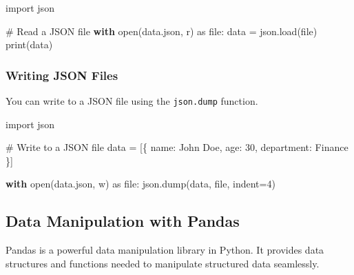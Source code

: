 \documentclass[
  letterpaper,
  DIV=11,
  numbers=noendperiod]{scrreprt}
\newenvironment{Shaded}{\begin{snugshade}}{\end{snugshade}}
\newcommand{\BuiltInTok}[1]{\textcolor[rgb]{0.00,0.23,0.31}{#1}}
\newcommand{\CommentTok}[1]{\textcolor[rgb]{0.37,0.37,0.37}{#1}}
\newcommand{\ControlFlowTok}[1]{\textcolor[rgb]{0.00,0.23,0.31}{\textbf{#1}}}
\newcommand{\DecValTok}[1]{\textcolor[rgb]{0.68,0.00,0.00}{#1}}
\newcommand{\ImportTok}[1]{\textcolor[rgb]{0.00,0.46,0.62}{#1}}
\newcommand{\NormalTok}[1]{\textcolor[rgb]{0.00,0.23,0.31}{#1}}
\newcommand{\OperatorTok}[1]{\textcolor[rgb]{0.37,0.37,0.37}{#1}}
\newcommand{\StringTok}[1]{\textcolor[rgb]{0.13,0.47,0.30}{#1}}
\begin{document}
\begin{Shaded}
\begin{Highlighting}[]
\ImportTok{import}\NormalTok{ json}

\CommentTok{\# Read a JSON file}
\ControlFlowTok{with} \BuiltInTok{open}\NormalTok{(}\StringTok{\textquotesingle{}data.json\textquotesingle{}}\NormalTok{, }\StringTok{\textquotesingle{}r\textquotesingle{}}\NormalTok{) }\ImportTok{as} \BuiltInTok{file}\NormalTok{:}
\NormalTok{    data }\OperatorTok{=}\NormalTok{ json.load(}\BuiltInTok{file}\NormalTok{)}
    \BuiltInTok{print}\NormalTok{(data)}
\end{Highlighting}
\end{Shaded}

\subsubsection{Writing JSON Files}\label{writing-json-files}

You can write to a JSON file using the \texttt{json.dump} function.

\begin{Shaded}
\begin{Highlighting}[]
\ImportTok{import}\NormalTok{ json}

\CommentTok{\# Write to a JSON file}
\NormalTok{data }\OperatorTok{=}\NormalTok{ [\{}
    \StringTok{\textquotesingle{}name\textquotesingle{}}\NormalTok{: }\StringTok{\textquotesingle{}John Doe\textquotesingle{}}\NormalTok{,}
    \StringTok{\textquotesingle{}age\textquotesingle{}}\NormalTok{: }\DecValTok{30}\NormalTok{,}
    \StringTok{\textquotesingle{}department\textquotesingle{}}\NormalTok{: }\StringTok{\textquotesingle{}Finance\textquotesingle{}}
\NormalTok{\}]}

\ControlFlowTok{with} \BuiltInTok{open}\NormalTok{(}\StringTok{\textquotesingle{}data.json\textquotesingle{}}\NormalTok{, }\StringTok{\textquotesingle{}w\textquotesingle{}}\NormalTok{) }\ImportTok{as} \BuiltInTok{file}\NormalTok{:}
\NormalTok{    json.dump(data, }\BuiltInTok{file}\NormalTok{, indent}\OperatorTok{=}\DecValTok{4}\NormalTok{)}
\end{Highlighting}
\end{Shaded}

\subsection{Data Manipulation with
Pandas}\label{data-manipulation-with-pandas}

Pandas is a powerful data manipulation library in Python. It provides
data structures and functions needed to manipulate structured data
seamlessly.
\end{document}
